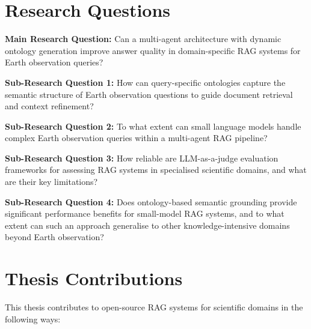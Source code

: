 \section{Research Questions}
\label{sec:research-questions}

\textbf{Main Research Question:} Can a multi-agent architecture with dynamic ontology generation improve answer quality in domain-specific RAG systems for Earth observation queries?

\textbf{Sub-Research Question 1:} How can query-specific ontologies capture the semantic structure of Earth observation questions to guide document retrieval and context refinement?

\textbf{Sub-Research Question 2:} To what extent can small language models handle complex Earth observation queries within a multi-agent RAG pipeline?

\textbf{Sub-Research Question 3:} How reliable are LLM-as-a-judge evaluation frameworks for assessing RAG systems in specialised scientific domains, and what are their key limitations?

\textbf{Sub-Research Question 4:} Does ontology-based semantic grounding provide significant performance benefits for small-model RAG systems, and to what extent can such an approach generalise to other knowledge-intensive domains beyond Earth observation?

\section{Thesis Contributions}
\label{sec:contribution}

This thesis contributes to open-source RAG systems for scientific domains in the following ways:


